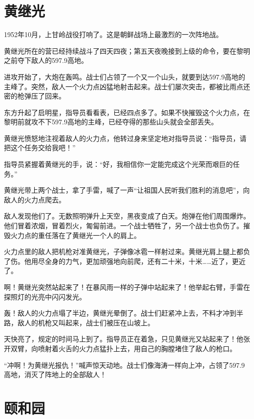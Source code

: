 \documentclass[12pt,UTF-8,openany]{ctexbook}
\begin{document}
\chapter{黄继光}

\begin{large}
    
    1952年10月，上甘岭战役打响了。这是朝鲜战场上最激烈的一次阵地战。
    
    黄继光所在的营已经持续战斗了四天四夜；第五天夜晚接到上级的命令，要在黎明之前夺下敌人的597.9高地。
    
    进攻开始了，大炮在轰鸣。战士们占领了一个又一个山头，就要到达597.9高地的主峰了。突然，敌人一个火力点凶猛地射击起来。战士们屡次突击，都被比雨点还密的枪弹压了回来。
    
    东方升起了启明星，指导员看看表，已经四点多了。如果不快摧毁这个火力点，在黎明前就攻不下597.9高地的主峰，已经夺得的那些山头就会全部丢失。
    
    黄继光愤怒地注视着敌人的火力点，他转过身来坚定地对指导员说：“指导员，请把这个任务交给我吧！”
    
    指导员紧握着黄继光的手，说：“好，我相信你一定能完成这个光荣而艰巨的任务。”
    
    黄继光带上两个战士，拿了手雷，喊了一声“让祖国人民听我们胜利的消息吧”，向敌人的火力点爬去。
    
    敌人发现他们了。无数照明弹升上天空，黑夜变成了白天。炮弹在他们周围爆炸。他们冒着浓烟，冒着烈火，匍匐前进。一个战士牺牲了，另一个战士也负伤了。摧毁火力点的重任落在了黄继光一个人的肩上。
    
    火力点里的敌人把机枪对准黄继光，子弹像冰雹一样射过来。黄继光肩上腿上都负了伤。他用尽全身的力气，更加顽强地向前爬，还有二十米，十米……近了，更近了。
    
    啊！黄继光突然站起来了！在暴风雨一样的子弹中站起来了！他举起右臂，手雷在探照灯的光亮中闪闪发光。
    
    轰！敌人的火力点塌了半边，黄继光晕倒了。战士们赶紧冲上去，不料才冲到半路，敌人的机枪又叫起来，战士们被压在山坡上。
    
    天快亮了，规定的时间马上到了。指导员正在着急，只见黄继光又站起来了！他张开双臂，向喷射着火舌的火力点猛扑上去，用自己的胸膛堵住了敌人的枪口。
    
    “冲啊！为黄继光报仇！”喊声惊天动地。战士们像海涛一样向上冲，占领了597.9高地，消灭了阵地上的全部敌人！
    
\end{large}



\chapter{颐和园}
\end{document}
